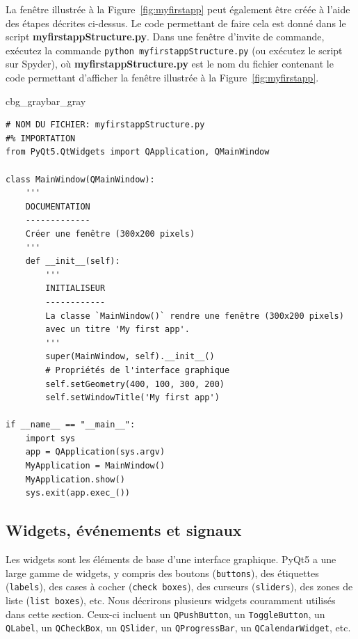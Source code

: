 \documentclass[%
oneside,                 %
final,                   %
10pt,french]{article}
\newenvironment{_pro_tight}[2]{
   \def\FrameCommand{\color{#2}\vrule width 1mm\normalcolor\colorbox{#1}}
   \FrameRule0.6pt\MakeFramed {\advance\hsize-2mm\FrameRestore}\vskip3mm}
   {\vskip0mm\endMakeFramed}
\newenvironment{pro}[2]{
\bgroup\rmfamily
\fboxsep=0mm\relax
\begin{_pro_tight}{#1}{#2}
\list{}{\parsep=-2mm\parskip=0mm\topsep=0pt\leftmargin=2mm
\rightmargin=2\leftmargin\leftmargin=4pt\relax}
\item\relax}
{\endlist\end{_pro_tight}\egroup}
\begin{document}
\noindent
La fenêtre illustrée à la Figure~\ref{fig:myfirstapp} peut également être créée à l'aide des étapes décrites ci-dessus. Le code permettant de faire cela est donné dans le script \textbf{myfirstappStructure.py}. Dans une fenêtre d'invite de commande, exécutez la commande \texttt{python myfirstappStructure.py} (ou exécutez le script sur Spyder), où \textbf{myfirstappStructure.py} est le nom du fichier contenant le code permettant d'afficher la fenêtre illustrée à la Figure~\ref{fig:myfirstapp}.

\begin{pro}{cbg_gray}{bar_gray}\begin{verbatim}
# NOM DU FICHIER: myfirstappStructure.py
#% IMPORTATION
from PyQt5.QtWidgets import QApplication, QMainWindow

class MainWindow(QMainWindow):
    '''
    DOCUMENTATION
    -------------
    Créer une fenêtre (300x200 pixels)
    '''
    def __init__(self):
        '''
        INITIALISEUR 
        ------------
        La classe `MainWindow()` rendre une fenêtre (300x200 pixels) 
        avec un titre 'My first app'.
        '''
        super(MainWindow, self).__init__()
        # Propriétés de l'interface graphique
        self.setGeometry(400, 100, 300, 200)
        self.setWindowTitle('My first app')

if __name__ == "__main__":
    import sys
    app = QApplication(sys.argv)
    MyApplication = MainWindow()
    MyApplication.show()
    sys.exit(app.exec_())
\end{verbatim}
\end{pro}
\noindent

\subsection{Widgets, événements et signaux}
Les widgets sont les éléments de base d'une interface graphique. PyQt5 a une large gamme de widgets, y compris des boutons (\texttt{buttons}), des étiquettes (\texttt{labels}), des cases à cocher (\texttt{check boxes}), des curseurs (\texttt{sliders}), des zones de liste (\texttt{list boxes}), etc. Nous décrirons plusieurs widgets couramment utilisés dans cette section. Ceux-ci incluent un \texttt{QPushButton}, un \texttt{ToggleButton}, un \texttt{QLabel}, un \texttt{QCheckBox}, un \texttt{QSlider}, un \texttt{QProgressBar}, un \texttt{QCalendarWidget}, etc.
\end{document}
